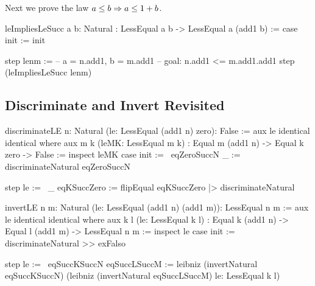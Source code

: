 \noindent Next we prove the law $a \le b \Rightarrow a \le 1 + b$.

\begin{alba}
    leImpliesLeSucc
        {a b: Natural}
        :  LessEqual a b  ->  LessEqual a (add1 b)
    :=
        case
            init :=
                init

            step lenm :=
                -- a = n.add1, b = m.add1
                -- goal: n.add1 <= m.add1.add1
                step (leImpliesLeSucc lenm)
\end{alba}








\vskip 5mm
\subsection{Discriminate and Invert Revisited}


\begin{alba}
    discriminateLE {n: Natural} (le: LessEqual (add1 n) zero): False :=
        aux
            le
            identical
            identical
        where
            aux
                {m k}
                (leMK: LessEqual m k)
                : Equal m (add1 n) -> Equal k zero -> False
            :=
                inspect leMK case
                    init :=
                        \ eqZeroSuccN _ :=
                            discriminateNatural eqZeroSuccN

                    step le :=
                        \ _ eqKSuccZero :=
                            flipEqual eqKSuccZero
                            |> discriminateNatural


    invertLE {n m: Natural} (le: LessEqual (add1 n) (add1 m)): LessEqual n m :=
        aux
            le
            identical
            identical
        where
            aux
                {k l}
                (le: LessEqual k l)
                : Equal k (add1 n) -> Equal l (add1 m) -> LessEqual n m
            :=
                inspect le case
                    init :=
                        discriminateNatural >> exFalso

                    step le :=
                        \ eqSuccKSuccN eqSuccLSuccM :=
                            leibniz
                                (invertNatural eqSuccKSuccN)
                                (leibniz
                                    (invertNatural eqSuccLSuccM)
                                    le: LessEqual k l)
\end{alba}













